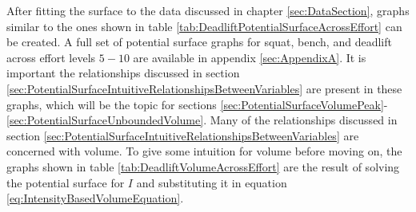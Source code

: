 After fitting the surface to the data discussed in chapter \ref{sec:DataSection}, graphs similar to the ones shown in table \ref{tab:DeadliftPotentialSurfaceAcrossEffort} can be created. A full set of potential surface graphs for squat, bench, and deadlift across effort levels $5-10$ are available in appendix \ref{sec:AppendixA}. It is important the relationships discussed in section \ref{sec:PotentialSurfaceIntuitiveRelationshipsBetweenVariables} are present in these graphs, which will be the topic for sections \ref{sec:PotentialSurfaceVolumePeak}-\ref{sec:PotentialSurfaceUnboundedVolume}. Many of the relationships discussed in section \ref{sec:PotentialSurfaceIntuitiveRelationshipsBetweenVariables} are concerned with volume. To give some intuition for volume before moving on, the graphs shown in table \ref{tab:DeadliftVolumeAcrossEffort} are the result of solving the potential surface for $I$ and substituting it in equation \ref{eq:IntensityBasedVolumeEquation}.

